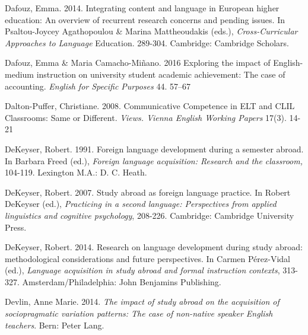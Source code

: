 \begin{styletextbox}
Dafouz, Emma. 2014. Integrating content and language in European higher education: An overview of recurrent research concerns and pending issues. In Psaltou-Joycey Agathopoulou \& Marina Mattheoudakis (eds.), \textit{Cross-Curricular Approaches to Language }Education. 289-304.\textit{ }Cambridge: Cambridge Scholars. 
\end{styletextbox}


\begin{styleStandard}
Dafouz, Emma \& Maria Camacho-Miñano. 2016 Exploring the impact of English-medium instruction on university student academic achievement: The case of accounting. \textit{English for Specific Purposes} 44. 57–67
\end{styleStandard}

\begin{styleStandard}
Dalton-Puffer, Christiane. 2008. Communicative Competence in ELT and CLIL Classrooms: Same or Different. \textit{Views. Vienna English Working Papers} 17(3). 14-21
\end{styleStandard}


\begin{styleStandard}
DeKeyser, Robert. 1991. Foreign language development during a semester abroad. In Barbara Freed (ed.), \textit{Foreign language acquisition: Research and the classroom, }104-119. Lexington M.A.: D. C. Heath.
\end{styleStandard}


\begin{styleStandard}
DeKeyser, Robert. 2007. Study abroad as foreign language practice. In Robert DeKeyser (ed.), \textit{Practicing in a second language: Perspectives from applied linguistics and cognitive psychology}, 208-226. Cambridge: Cambridge University Press.
\end{styleStandard}


\begin{styleStandard}
DeKeyser, Robert. 2014. Research on language development during study abroad: methodological considerations and future perspectives. In Carmen Pérez-Vidal (ed.), \textit{Language acquisition in study abroad and formal instruction }\textit{contexts}, 313-327. Amsterdam/Philadelphia: John Benjamins Publishing.
\end{styleStandard}


\begin{styleStandard}
Devlin, Anne Marie. 2014. \textit{The impact of study abroad on the acquisition of sociopragmatic variation patterns: The case of non-native speaker English teachers}. Bern: Peter Lang. 
\end{styleStandard}


